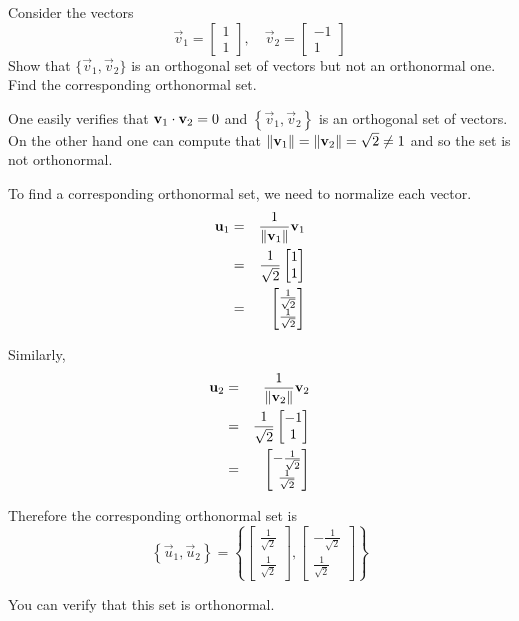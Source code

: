 \documentclass{ximera}
\begin{document}
\begin{example}\label{ex:orthonormalset}
Consider the vectors
\[
\vec{v}_1=\begin{bmatrix}
1 \\
1
\end{bmatrix},\quad \vec{v}_2  =
\begin{bmatrix}
-1 \\
1
\end{bmatrix}
\]
Show that $\{\vec{v}_1,\vec{v}_2\}$ is an orthogonal set of vectors  but not an orthonormal one. Find the corresponding orthonormal set.

\begin{explanation}
One easily verifies that $\mathbf{v}_1 \cdot \mathbf{v}_2 = 0$ and
$\left\{ \vec{v}_1, \vec{v}_2 \right\}$ is an orthogonal set of
vectors. On the other hand one can compute that ${\left\lVert\mathbf{v}_1\right\rVert}= {\left\lVert\mathbf{v}_2\right\rVert} =
\sqrt{2} \neq 1$ and so the set is not orthonormal.

To find a corresponding orthonormal set, we need to
normalize each vector. 
\begin{eqnarray*}
\mathbf{u}_1 &=& \frac{1}{\left\lVert\mathbf{v}_1\right\rVert}\mathbf{v}_1\\
&=& \frac{1}{\sqrt{2}} \begin{bmatrix}
1 \\
1
\end{bmatrix} \\
&=&
\begin{bmatrix}
\frac{1}{\sqrt{2}} \\
\frac{1}{\sqrt{2}}
\end{bmatrix}
\end{eqnarray*}

Similarly,
\begin{eqnarray*}
\mathbf{u}_2 &=& \frac{1}{\left\lVert\mathbf{v}_2\right\rVert}\mathbf{v}_2\\
&=& \frac{1}{\sqrt{2}} \begin{bmatrix}
-1 \\
1
\end{bmatrix} \\
&=&
\begin{bmatrix}
-\frac{1}{\sqrt{2}} \\
\frac{1}{\sqrt{2}}
\end{bmatrix}
\end{eqnarray*}

Therefore the corresponding orthonormal set is
\[
\left\{ \vec{u}_1, \vec{u}_2 \right\} =
\left\{
\begin{bmatrix}
\frac{1}{\sqrt{2}} \\
\frac{1}{\sqrt{2}}
\end{bmatrix},
\begin{bmatrix}
-\frac{1}{\sqrt{2}} \\
\frac{1}{\sqrt{2}}
\end{bmatrix}
\right\}
\]

You can verify that this set is orthonormal.
\end{explanation}
\end{example}
\end{document}

